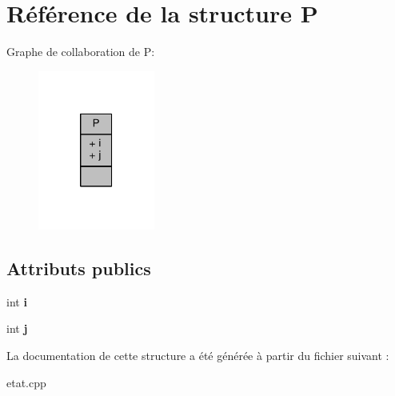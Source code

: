 \hypertarget{structP}{}\section{Référence de la structure P}
\label{structP}


Graphe de collaboration de P\+:\nopagebreak
\begin{figure}[H]
\begin{center}
\leavevmode
\includegraphics[width=109pt]{structP__coll__graph}
\end{center}
\end{figure}
\subsection*{Attributs publics}
\begin{DoxyCompactItemize}
\item 
int {\bfseries i}\hypertarget{structP_a529b8eb5e5e9de9bbfa1ace78d7c6a39}{}\label{structP_a529b8eb5e5e9de9bbfa1ace78d7c6a39}

\item 
int {\bfseries j}\hypertarget{structP_a2a742a8540f2aa8b480c4def50e4edd0}{}\label{structP_a2a742a8540f2aa8b480c4def50e4edd0}

\end{DoxyCompactItemize}


La documentation de cette structure a été générée à partir du fichier suivant \+:\begin{DoxyCompactItemize}
\item 
etat.\+cpp\end{DoxyCompactItemize}
